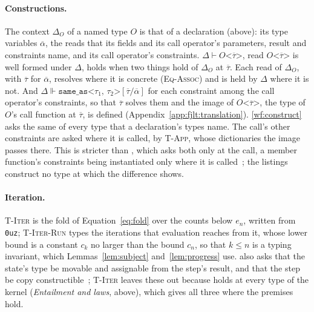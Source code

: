 \paragraph{Constructions.}
\label{app:fjlt:construct}
The context $\Delta_O$ of a named type $O$ is that of a declaration (above): its type variables $\overline{\alpha}$, the reads that its fields and its call operator's parameters, result and constraints name, and its call operator's constraints.
$\Delta \vdash O\texttt{<}\overline{\tau}\texttt{>}$, read $O\texttt{<}\overline{\tau}\texttt{>}$ is well formed under $\Delta$, holds when two things hold of $\Delta_O$ at $\overline{\tau}$.
Each read of $\Delta_O$, with $\overline{\tau}$ for $\overline{\alpha}$, resolves where it is concrete (\textsc{Eq-Assoc}) and is held by $\Delta$ where it is not.
And $\Delta \Vdash \texttt{same\_as<}\tau_1\texttt{, }\tau_2\texttt{>}[\overline{\tau}/\overline{\alpha}]$ for each  constraint among the call operator's constraints, so that $\overline{\tau}$ solves them and the image of $O\texttt{<}\overline{\tau}\texttt{>}$, the type of $O$'s call function at $\overline{\tau}$, is defined (Appendix~\ref{app:fjlt:translation}).
\ref{wf:construct} asks the same of every type that a declaration's types name.
The call's other constraints are asked where it is called, by \textsc{T-App}, whose dictionaries the image passes there.
This is stricter than \Cpp{}, which asks both only at the call, a member function's constraints being instantiated only where it is called~\cite[{\texttt{temp.inst}}]{cpp23standard}; the listings construct no type at which the difference shows.

\paragraph{Iteration.}
\textsc{T-Iter} is the fold of Equation~\eqref{eq:fold} over the counts below $e_n$, written from \texttt{0uz}; \textsc{T-Iter-Run} types the iterations that evaluation reaches from it, whose lower bound is a constant $c_k$ no larger than the bound $c_n$, so that $k \le n$ is a typing invariant, which Lemmas~\ref{lem:subject} and~\ref{lem:progress} use.
 also asks that the state's type be movable and assignable from the step's result, and that the step be copy constructible~\cite[{\texttt{alg.fold}}]{cpp23standard}; \textsc{T-Iter} leaves these out because  holds at every type of the kernel (\emph{Entailment and laws}, above), which gives all three where the premises hold.

